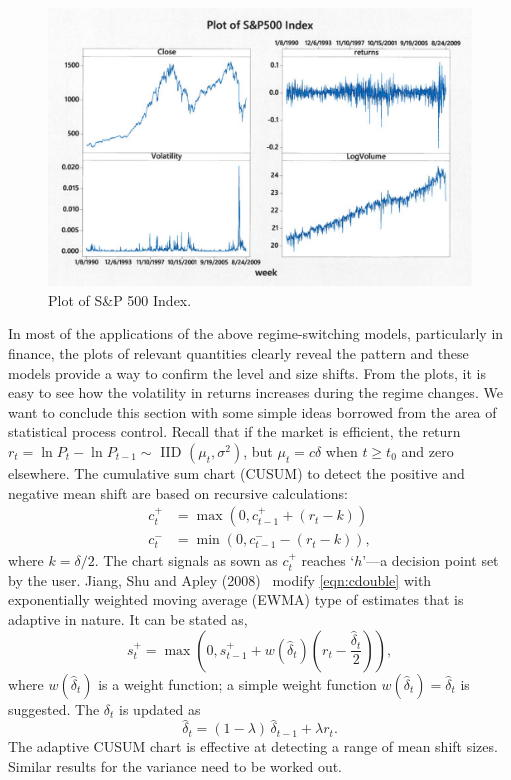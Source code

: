 	\begin{figure}[!ht]
	\centering
	\includegraphics[width=\textwidth]{chapters/chapter_uvts/figures/sp500.png}
	\caption{Plot of S\&P 500 Index. \label{fig:sp500}}
	\end{figure}

In most of the applications of the above regime-switching models, particularly in finance, the plots of relevant quantities clearly reveal the pattern and these models provide a way to confirm the level and size shifts. From the plots, it is easy to see how the volatility in returns increases during the regime changes. We want to conclude this section with some simple ideas borrowed from the area of statistical process control. Recall that if the market is efficient, the return $r_t= \ln P_t - \ln P_{t-1} \sim $ IID $(\mu_t, \sigma^2)$, but $\mu_t=c\delta$ when $t\geq t_0$ and zero elsewhere. The cumulative sum chart (CUSUM) to detect the positive and negative mean shift are based on recursive calculations:
	\begin{equation} \label{eqn:cdouble}
	\begin{split}
	c_t^+&= \max(0, c_{t-1}^+ + (r_t-k)) \\
	c_t^-&= \min(0, c_{t-1}^- - (r_t-k)),
	\end{split}
	\end{equation}
where $k= \delta/2$. The chart signals as sown as $c_t^+$ reaches `$h$'---a decision point set by the user. Jiang, Shu and Apley (2008)~\cite{shuap} modify \eqref{eqn:cdouble} with exponentially weighted moving average (EWMA) type of estimates that is adaptive in nature. It can be stated as,
	\begin{equation}\label{eqn:elma}
	s_t^+= \max \left( 0, s_{t-1}^+ + w(\hat{\delta}_t) \left(r_t - \frac{\hat{\delta}_t}{2} \right) \right),
	\end{equation}
where $w(\hat{\delta}_t)$ is a weight function; a simple weight function $w(\hat{\delta}_t)=\hat{\delta}_t$ is suggested. The $\delta_t$ is updated as 
	\begin{equation}\label{eqn:updatedelt}
	\hat{\delta}_t= (1-\lambda)\, \hat{\delta}_{t-1} + \lambda r_t.
	\end{equation}
The adaptive CUSUM chart is effective at detecting a range of mean shift sizes. Similar results for the variance need to be worked out.


